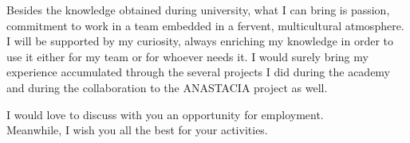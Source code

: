 \documentclass[12pt,a4paper,sans]{moderncv}        %
\begin{document}
Besides the knowledge obtained during university, what I can bring is passion, commitment to work in a team embedded in a fervent, multicultural atmosphere. I will be supported by my curiosity, always enriching my knowledge in order to use it either for my team or for whoever needs it. I would surely bring my experience accumulated through the several projects I did during the academy and during the collaboration to the ANASTACIA project as well. 

I would love to discuss with you an opportunity for employment.\\ 
Meanwhile, I wish you all the best for your activities.

\makeletterclosing





\end{document}
